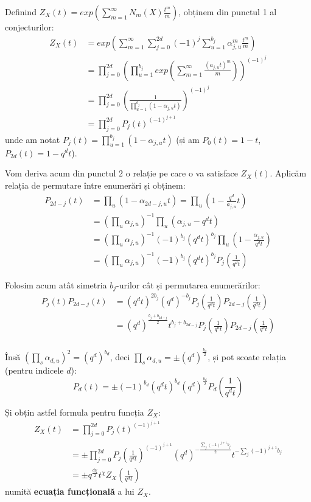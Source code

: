 \documentclass[13pt,openany]{book}
\begin{document}
Definind $Z_X(t) = exp(\sum\limits_{m=1}^{\infty} N_m(X) \frac{t^m}{m})$, obținem din punctul 1 al conjecturilor:
\begin{align*}
Z_X(t)&=exp(\sum\limits_{m=1}^{\infty} \sum\limits_{j=0}^{2d} (-1)^j \sum\limits_{u=1}^{b_j} \alpha_{j,u}^m \frac{t^m}{m})\\
&=\prod\limits_{j=0}^{2d} (\prod_{u=1}^{b_j} exp(\sum\limits_{m=1}^{\infty} \frac{(a_{j,u} t)^m}{m}))^{(-1)^j}\\
&=\prod\limits_{j=0}^{2d} (\frac{1}{\prod\limits_{u=1}^{b_j}(1-\alpha_{j,u}t)})^{(-1)^j}\\
&=\prod\limits_{j=0}^{2d} P_j(t)^{(-1)^{j+1}}
\end{align*}
unde am notat $P_j(t)=\prod\limits_{u=1}^{b_j}(1-\alpha_{j,u}t)$ (și am $P_0(t)=1-t$, $P_{2d}(t)=1-q^dt$).

Vom deriva acum din punctul 2 o relație pe care o va satisface $Z_X(t)$. Aplicăm relația de permutare între enumerări și obținem:
\begin{align*}
P_{2d-j}(t)&=\prod_u(1-\alpha_{2d-j,u}t)=\prod_u(1-\frac{q^d}{a_{j,u}}t)\\
&=(\prod_u \alpha_{j,u})^{-1} \prod_u(\alpha_{j,u}-q^dt)\\
&=(\prod_u \alpha_{j,u})^{-1} (-1)^{b_j} (q^dt)^{b_j} \prod_u (1-\frac{\alpha_{j,u}}{q^dt})\\
&=(\prod_u \alpha_{j,u})^{-1} (-1)^{b_j} (q^dt)^{b_j}P_j(\frac{1}{q^dt})
\end{align*}

Folosim acum atât simetria $b_j$-urilor cât și permutarea enumerărilor:
\begin{align*}
P_j(t)P_{2d-j}(t)&=(q^dt)^{2b_j} (q^d)^{-b_j} P_j(\frac{1}{q^dt}) P_{2d-j}(\frac{1}{q^dt})\\
&=(q^d)^{\frac{b_j+b_{2d-j}}{2}} t^{b_j+b_{2d-j}}P_j(\frac{1}{q^dt}) P_{2d-j}(\frac{1}{q^dt})\\
\end{align*}

Însă $(\prod\limits_s \alpha_{d,u})^2=(q^d)^{b_d}$, deci $\prod\limits_s \alpha_{d,u}=\pm (q^d)^{\frac{b_d}{2}}$, și pot scoate relația (pentru indicele $d$):
$$P_d(t)=\pm (-1)^{b_d} (q^dt)^{b_d} (q^d)^{\frac{b_d}{2}} P_d(\frac{1}{q^dt})$$

Și obțin astfel formula pentru funcția $Z_X$:
\begin{align*}
Z_X(t)&=\prod_{j=0}^{2d} P_j(t)^{(-1)^{j+1}}\\
&=\pm \prod_{j=0}^{2d} P_j(\frac{1}{q^dt})^{(-1)^{j+1}} (q^d)^{-\frac{\sum\limits_j (-1)^{j+1} b_j}{2}} t^{-\sum\limits_j (-1)^{j+1} b_j}\\
&=\pm q^{\frac{d\chi}{2}} t^{\chi} Z_X(\frac{1}{q^dt})
\end{align*}
numită {\bf ecuația funcțională} a lui $Z_X$.
\end{document}
